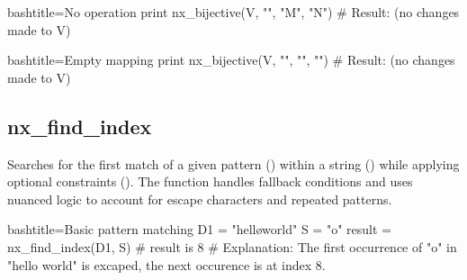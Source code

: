 \begin{NexCodeBox}{bash}{title={No operation}}
    print nx_bijective(V, "", "M", "N")
    # Result: (no changes made to V)
\end{NexCodeBox}

\begin{NexCodeBox}{bash}{title={Empty mapping}}
    print nx_bijective(V, "", "", "")
    # Result: (no changes made to V)
\end{NexCodeBox}

\newpage
\subsection{nx_find_index}
\label{nx_find_index}

\begin{NexMainBox}
	\begin{NexMainBox}
		Searches for the first match of a given pattern () within a string () while applying optional constraints (). The function handles fallback conditions and uses nuanced logic to account for escape characters and repeated patterns.
	\end{NexMainBox}
	\begin{NexMainBox}
		\begin{NexListDark}
		\end{NexListDark}
	\end{NexMainBox}
\end{NexMainBox}

\begin{NexCodeBox}{bash}{title={Basic pattern matching}}
	D1 = "hell\o world"
	S = "o"
	result = nx_find_index(D1, S)
	# result is 8
	# Explanation: The first occurrence of "o" in "hello world" is excaped, the next occurence is at index 8.
\end{NexCodeBox}

